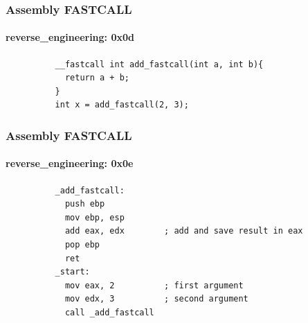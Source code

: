 \documentclass[aspectratio=169]{beamer}
\begin{document}
\begin{frame}[fragile]{}
  \frametitle{Assembly FASTCALL}
  \framesubtitle{reverse\_engineering: 0x0d}
  \begin{center}
    \begin{tcolorbox}[title=cdecl.c,colback=black]
        \begin{verbatim}
          __fastcall int add_fastcall(int a, int b){
            return a + b;
          }
          int x = add_fastcall(2, 3);
        \end{verbatim}
    \end{tcolorbox}
  \end{center}
\end{frame}

\begin{frame}[fragile]{}
  \frametitle{Assembly FASTCALL}
  \framesubtitle{reverse\_engineering: 0x0e}
  \begin{center}
    \begin{tcolorbox}[title=fastcall.asm,colback=black]
        \begin{verbatim}
          _add_fastcall:
            push ebp
            mov ebp, esp
            add eax, edx        ; add and save result in eax
            pop ebp
            ret
          _start:
            mov eax, 2          ; first argument
            mov edx, 3          ; second argument
            call _add_fastcall
        \end{verbatim}
    \end{tcolorbox}
  \end{center}
\end{frame}
\end{document}
